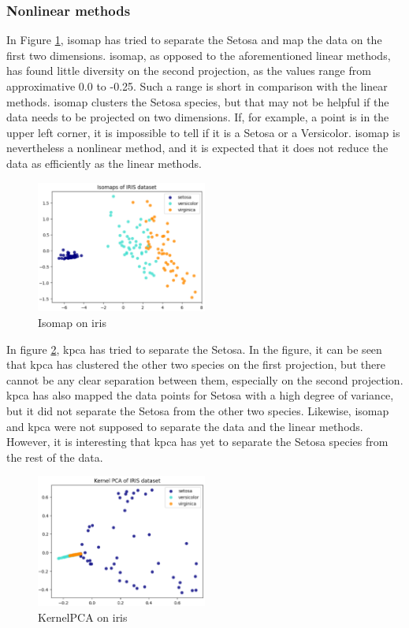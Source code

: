 \subsubsection{Nonlinear methods}\label{subsubsec:nonlinear-methods-on-iris}
In Figure \ref{fig:iris-isomap}, \gls{isomap} has tried to separate the Setosa and map the data on the first two dimensions. \gls{isomap}, as opposed to the aforementioned linear methods, has found little diversity on the second projection, as the values range from approximative 0.0 to -0.25. Such a range is short in comparison with the linear methods. \gls{isomap} clusters the Setosa species, but that may not be helpful if the data needs to be projected on two dimensions. If, for example, a point is in the upper left corner, it is impossible to tell if it is a Setosa or a Versicolor. \gls{isomap} is nevertheless a nonlinear method, and it is expected that it does not reduce the data as efficiently as the linear methods.

\begin{figure}[htb!]
    \centering
    \includegraphics[width=0.5\textwidth]{figures/theory-example-figures/iris-isomap.png}
    \caption{Isomap on iris}
    \label{fig:iris-isomap}
    \end{figure}

In figure \ref{fig:iris-kernelpca}, \gls{kpca} has tried to separate the Setosa. In the figure, it can be seen that \gls{kpca} has clustered the other two species on the first projection, but there cannot be any clear separation between them, especially on the second projection. \gls{kpca} has also mapped the data points for Setosa with a high degree of variance, but it did not separate the Setosa from the other two species. Likewise, \gls{isomap} and \gls{kpca} were not supposed to separate the data and the linear methods. However, it is interesting that \gls{kpca} has yet to separate the Setosa species from the rest of the data.

\begin{figure}[htb!]
    \centering
    \includegraphics[width=0.5\textwidth]{figures/theory-example-figures/iris-kernelpca.png}
    \caption{KernelPCA on iris}
    \label{fig:iris-kernelpca}
    \end{figure}

